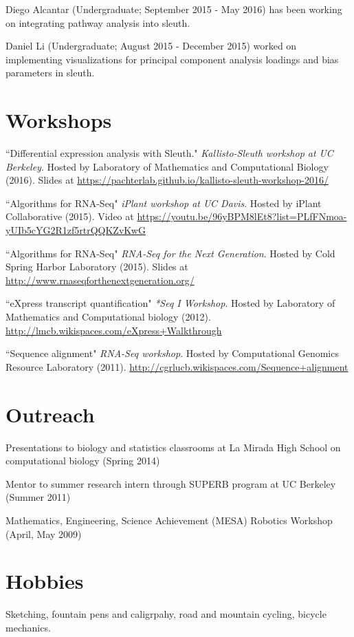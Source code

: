 \documentclass[overlapped]{res}
\begin{document}
\begin{resume}
Diego Alcantar (Undergraduate; September 2015 - May 2016) has been working on integrating pathway analysis into sleuth.

Daniel Li (Undergraduate; August 2015 - December 2015) worked on implementing visualizations for principal component analysis loadings and bias parameters in sleuth.

\section{\sc Workshops}
 ``Differential expression analysis with Sleuth." {\emph{Kallisto-Sleuth workshop at UC Berkeley}}. Hosted by Laboratory of Mathematics and Computational Biology (2016). Slides at \url{https://pachterlab.github.io/kallisto-sleuth-workshop-2016/}

``Algorithms for RNA-Seq" {\emph{iPlant workshop at UC Davis}}. Hosted by iPlant Collaborative (2015). Video at \url{https://youtu.be/96yBPM8lEt8?list=PLfFNmoa-yUIb5cYG2R1zf5rtrQQKZvKwG}

``Algorithms for RNA-Seq" {\emph{RNA-Seq for the Next Generation}}. Hosted by Cold Spring Harbor Laboratory (2015). Slides at \url{http://www.rnaseqforthenextgeneration.org/}

``eXpress transcript quantification" {\emph{*Seq I Workshop}}. Hosted by Laboratory of Mathematics and Computational biology (2012). \url{http://lmcb.wikispaces.com/eXpress+Walkthrough}

``Sequence alignment" {\emph{RNA-Seq workshop}}. Hosted by Computational Genomics Resource Laboratory (2011).  \url{http://cgrlucb.wikispaces.com/Sequence+alignment}

\newpage

\section{\sc Outreach}
Presentations to biology and statistics classrooms at La Mirada High School on
computational biology (Spring 2014)

Mentor to summer research intern through SUPERB program at UC Berkeley (Summer
2011)

Mathematics, Engineering, Science Achievement (MESA) Robotics Workshop
(April, May 2009)
\vspace{-.25cm}

\section{\sc Hobbies}
Sketching, fountain pens and caligrpahy, road and mountain cycling, bicycle mechanics.
\end{resume}
\end{document}
